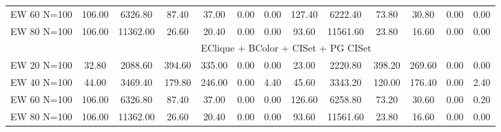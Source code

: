 \documentclass[landscape, 12pt]{report}
\begin{document}
\begin{tabular}{|c|cccccc|cccccc|}
	EW 60 N=100 & 106.00 & 6326.80 & 87.40 & 37.00 & 0.00 & 0.00 & 127.40 & 6222.40 & 73.80 & 30.80 & 0.00 & 0.00
	\\
	EW 80 N=100 & 106.00 & 11362.00 & 26.60 & 20.40 & 0.00 & 0.00 & 93.60 & 11561.60 & 23.80 & 16.60 & 0.00 & 0.00
	\\
	\hline 
	\multicolumn{1}{|c|}{} & \multicolumn{12}{|c|}{EClique + BColor + CISet + PG CISet} \\
	\hline
	EW 20 N=100 & 32.80 & 2088.60 & 394.60 & 335.00 & 0.00 & 0.00 & 23.00 & 2220.80 & 398.20 & 269.60 & 0.00 & 0.00
	\\
	EW 40 N=100 & 44.00 & 3469.40 & 179.80 & 246.00 & 0.00 & 4.40 & 45.60 & 3343.20 & 120.00 & 176.40 & 0.00 & 2.40
	\\
	EW 60 N=100 & 106.00 & 6326.80 & 87.40 & 37.00 & 0.00 & 0.00 & 126.60 & 6258.80 & 73.20 & 30.60 & 0.00 & 0.20
	\\
	EW 80 N=100 & 106.00 & 11362.00 & 26.60 & 20.40 & 0.00 & 0.00 & 93.60 & 11561.60 & 23.80 & 16.60 & 0.00 & 0.00
	\\
	\hline
	 \end{tabular}
	
\end{document}
